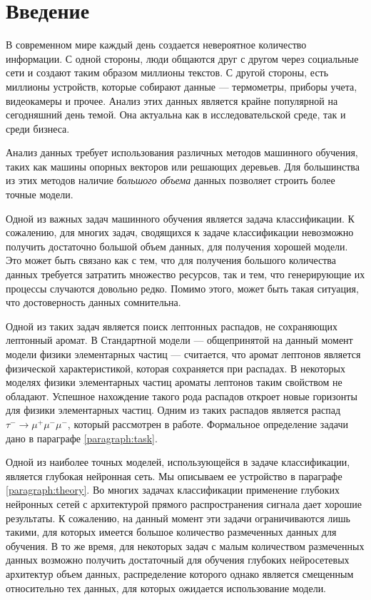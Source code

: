 \documentclass[14pt, a4paper]{extarticle}
\begin{document}
\tableofcontents

\newpage

\section*{Введение}

В современном мире каждый день создается невероятное количество информации. С одной стороны, люди общаются друг с другом через социальные сети и создают таким образом миллионы текстов. С другой стороны, есть миллионы устройств, которые собирают данные — термометры, приборы учета, видеокамеры и прочее. Анализ этих данных является крайне популярной на сегодняшний день темой. Она актуальна как в исследовательской среде, так и среди бизнеса. 

Анализ данных требует использования различных методов машинного обучения, таких как машины опорных векторов или решающих деревьев. Для большинства из этих методов наличие \textit{большого объема} данных позволяет строить более точные модели. 

Одной из важных задач машинного обучения является задача классификации. К сожалению, для многих задач, сводящихся к задаче классификации невозможно получить достаточно большой объем данных, для получения хорошей модели. Это может быть связано как с тем, что для получения большого количества данных требуется затратить множество ресурсов, так и тем, что генерирующие их процессы случаются довольно редко. Помимо этого, может быть такая ситуация, что достоверность данных сомнительна.

Одной из таких задач является поиск лептонных распадов, не сохраняющих лептонный аромат. В Стандартной модели — общепринятой на данный момент модели физики элементарных частиц — считается, что аромат лептонов является физической характеристикой, которая сохраняется при распадах. В некоторых моделях физики элементарных частиц ароматы лептонов таким свойством не обладают. Успешное нахождение такого рода распадов откроет новые горизонты для физики элементарных частиц. Одним из таких распадов является распад $\tau^-\rightarrow\mu^+ \mu^- \mu^-$, который рассмотрен в работе. Формальное определение задачи дано в параграфе \ref{paragraph:task}.

Одной из наиболее точных моделей, использующейся в задаче классификации, является глубокая нейронная сеть. Мы описываем ее устройство в параграфе \ref{paragraph:theory}. Во многих задачах классификации применение глубоких нейронных сетей с архитектурой прямого распространения сигнала дает хорошие результаты. К сожалению, на данный момент эти задачи ограничиваются лишь такими, для которых имеется большое количество размеченных данных для обучения. В то же время, для некоторых задач с малым количеством размеченных данных возможно получить достаточный для обучения глубоких нейросетевых архитектур объем данных, распределение которого однако является смещенным относительно тех данных, для которых ожидается использование модели.
\end{document}
